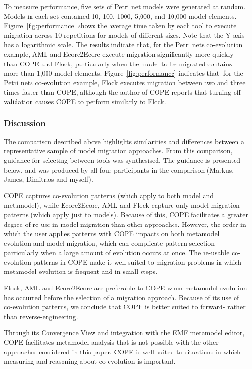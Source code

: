 To measure performance, five sets of Petri net models were generated at random. Models in each set contained 10, 100, 1000, 5,000, and 10,000 model elements.  Figure~\ref{fig:performance} shows the average time taken by each tool to execute migration across 10 repetitions for models of different sizes. Note that the Y axis has a logarithmic scale. The results indicate that, for the Petri nets co-evolution example, AML and Ecore2Ecore execute migration significantly more quickly than COPE and Flock, particularly when the model to be migrated contains more than 1,000 model elements. Figure~\ref{fig:performance} indicates that, for the Petri nets co-evolution example, Flock executes migration between two and three times faster than COPE, although the author of COPE reports that turning off validation causes COPE to perform similarly to Flock.


\subsubsection{Discussion}
\label{sec:discussion}
The comparison described above highlights similarities and differences between a representative sample of model migration approaches. From this comparison, guidance for selecting between tools was synthesised. The guidance is presented below, and was produced by all four participants in the comparison (Markus, James, Dimitrios and myself). 

COPE captures co-evolution patterns (which apply to both model and metamodel), while Ecore2Ecore, AML and Flock capture only model migration patterns (which apply just to models). Because of this, COPE facilitates a greater degree of re-use in model migration than other approaches. However, the order in which the user applies patterns with COPE impacts on both metamodel evolution and model migration, which can complicate pattern selection particularly when a large amount of evolution occurs at once. The re-usable co-evolution patterns in COPE make it well suited to migration problems in which metamodel evolution is frequent and in small steps.

Flock, AML and Ecore2Ecore are preferable to COPE when metamodel evolution has occurred before the selection of a migration approach. Because of its use of co-evolution patterns, we conclude that COPE is better suited to forward- rather than reverse-engineering.

Through its Convergence View and integration with the EMF metamodel editor, COPE facilitates metamodel analysis that is not possible with the other approaches considered in this paper. COPE is well-suited to situations in which measuring and reasoning about co-evolution is important.

